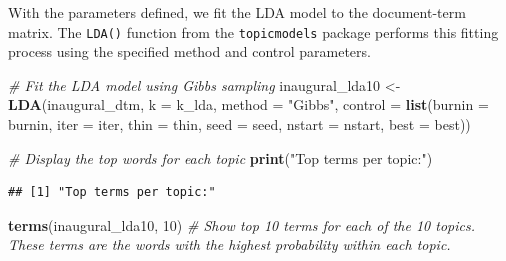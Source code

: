 \documentclass[
]{book}
\newenvironment{Shaded}{\begin{snugshade}}{\end{snugshade}}
\newcommand{\AttributeTok}[1]{\textcolor[rgb]{0.13,0.29,0.53}{#1}}
\newcommand{\CommentTok}[1]{\textcolor[rgb]{0.56,0.35,0.01}{\textit{#1}}}
\newcommand{\DecValTok}[1]{\textcolor[rgb]{0.00,0.00,0.81}{#1}}
\newcommand{\FunctionTok}[1]{\textcolor[rgb]{0.13,0.29,0.53}{\textbf{#1}}}
\newcommand{\NormalTok}[1]{#1}
\newcommand{\OtherTok}[1]{\textcolor[rgb]{0.56,0.35,0.01}{#1}}
\newcommand{\StringTok}[1]{\textcolor[rgb]{0.31,0.60,0.02}{#1}}
\begin{document}
With the parameters defined, we fit the LDA model to the document-term matrix.
The \texttt{LDA()} function from the \texttt{topicmodels} package performs this fitting process using the specified method and control parameters.

\begin{Shaded}
\begin{Highlighting}[]
\CommentTok{\# Fit the LDA model using Gibbs sampling}
\NormalTok{inaugural\_lda10 }\OtherTok{\textless{}{-}} \FunctionTok{LDA}\NormalTok{(inaugural\_dtm, }\AttributeTok{k =}\NormalTok{ k\_lda, }\AttributeTok{method =} \StringTok{"Gibbs"}\NormalTok{, }\AttributeTok{control =} \FunctionTok{list}\NormalTok{(}\AttributeTok{burnin =}\NormalTok{ burnin,}
    \AttributeTok{iter =}\NormalTok{ iter, }\AttributeTok{thin =}\NormalTok{ thin, }\AttributeTok{seed =}\NormalTok{ seed, }\AttributeTok{nstart =}\NormalTok{ nstart, }\AttributeTok{best =}\NormalTok{ best))}

\CommentTok{\# Display the top words for each topic}
\FunctionTok{print}\NormalTok{(}\StringTok{"Top terms per topic:"}\NormalTok{)}
\end{Highlighting}
\end{Shaded}

\begin{verbatim}
## [1] "Top terms per topic:"
\end{verbatim}

\begin{Shaded}
\begin{Highlighting}[]
\FunctionTok{terms}\NormalTok{(inaugural\_lda10, }\DecValTok{10}\NormalTok{)  }\CommentTok{\# Show top 10 terms for each of the 10 topics. These terms are the words with the highest probability within each topic.}
\end{Highlighting}
\end{Shaded}
\end{document}
